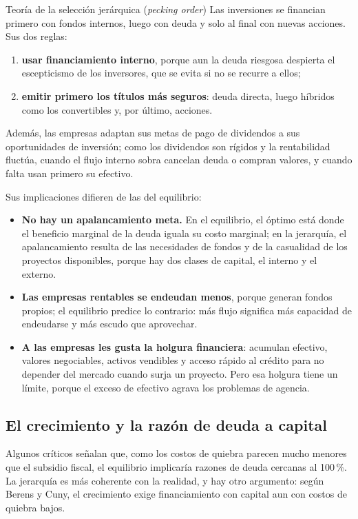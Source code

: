 \begin{definicion}{Teoría de la selección jerárquica (\emph{pecking order})}
Las inversiones se financian primero con fondos internos, luego con deuda y solo al final con nuevas acciones. Sus dos reglas:
\begin{enumerate}
\item \textbf{usar financiamiento interno}, porque aun la deuda riesgosa despierta el escepticismo de los inversores, que se evita si no se recurre a ellos;
\item \textbf{emitir primero los títulos más seguros}: deuda directa, luego híbridos como los convertibles y, por último, acciones.
\end{enumerate}
Además, las empresas adaptan sus metas de pago de dividendos a sus oportunidades de inversión; como los dividendos son rígidos y la rentabilidad fluctúa, cuando el flujo interno sobra cancelan deuda o compran valores, y cuando falta usan primero su efectivo.
\end{definicion}

Sus implicaciones difieren de las del equilibrio:
\begin{itemize}
\item \textbf{No hay un apalancamiento meta.} En el equilibrio, el óptimo está donde el beneficio marginal de la deuda iguala su costo marginal; en la jerarquía, el apalancamiento resulta de las necesidades de fondos y de la casualidad de los proyectos disponibles, porque hay dos clases de capital, el interno y el externo.
\item \textbf{Las empresas rentables se endeudan menos}, porque generan fondos propios; el equilibrio predice lo contrario: más flujo significa más capacidad de endeudarse y más escudo que aprovechar.
\item \textbf{A las empresas les gusta la holgura financiera}: acumulan efectivo, valores negociables, activos vendibles y acceso rápido al crédito para no depender del mercado cuando surja un proyecto. Pero esa holgura tiene un límite, porque el exceso de efectivo agrava los problemas de agencia.
\end{itemize}

\subsection{El crecimiento y la razón de deuda a capital}

Algunos críticos señalan que, como los costos de quiebra parecen mucho menores que el subsidio fiscal, el equilibrio implicaría razones de deuda cercanas al 100\,\%. La jerarquía es más coherente con la realidad, y hay otro argumento: según Berens y Cuny, el crecimiento exige financiamiento con capital aun con costos de quiebra bajos.

